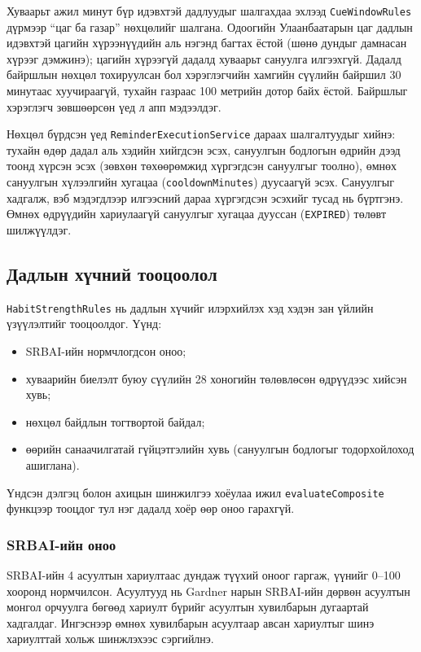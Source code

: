 Хуваарьт ажил минут бүр идэвхтэй дадлуудыг шалгахдаа эхлээд \texttt{CueWindowRules} дүрмээр ``цаг ба газар'' нөхцөлийг шалгана. Одоогийн Улаанбаатарын цаг дадлын идэвхтэй цагийн хүрээнүүдийн аль нэгэнд багтах ёстой (шөнө дундыг дамнасан хүрээг дэмжинэ); цагийн хүрээгүй дадалд хуваарьт сануулга илгээхгүй. Дадалд байршлын нөхцөл тохируулсан бол хэрэглэгчийн хамгийн сүүлийн байршил 30 минутаас хуучираагүй, тухайн газраас 100 метрийн дотор байх ёстой. Байршлыг хэрэглэгч зөвшөөрсөн үед л апп мэдээлдэг.

Нөхцөл бүрдсэн үед \texttt{ReminderExecutionService} дараах шалгалтуудыг хийнэ: тухайн өдөр дадал аль хэдийн хийгдсэн эсэх, сануулгын бодлогын өдрийн дээд тоонд хүрсэн эсэх (зөвхөн төхөөрөмжид хүргэгдсэн сануулгыг тоолно), өмнөх сануулгын хүлээлгийн хугацаа (\texttt{cooldownMinutes}) дуусаагүй эсэх. Сануулгыг хадгалж, вэб мэдэгдлээр илгээсний дараа хүргэгдсэн эсэхийг тусад нь бүртгэнэ. Өмнөх өдрүүдийн хариулаагүй сануулгыг хугацаа дууссан (\texttt{EXPIRED}) төлөвт шилжүүлдэг.

\subsection{Дадлын хүчний тооцоолол}

\texttt{HabitStrengthRules} нь дадлын хүчийг илэрхийлэх хэд хэдэн зан үйлийн үзүүлэлтийг тооцоолдог. Үүнд:

\begin{itemize}
    \item SRBAI-ийн нормчлогдсон оноо;
    \item хуваарийн биелэлт буюу сүүлийн 28 хоногийн төлөвлөсөн өдрүүдээс хийсэн хувь;
    \item нөхцөл байдлын тогтвортой байдал;
    \item өөрийн санаачилгатай гүйцэтгэлийн хувь (сануулгын бодлогыг тодорхойлоход ашиглана).
\end{itemize}

Үндсэн дэлгэц болон ахицын шинжилгээ хоёулаа ижил \texttt{evaluateComposite} функцээр тооцдог тул нэг дадалд хоёр өөр оноо гарахгүй.

\subsubsection*{SRBAI-ийн оноо}

SRBAI-ийн 4 асуултын хариултаас дундаж түүхий оноог гаргаж, үүнийг 0--100 хооронд нормчилсон. Асуултууд нь Gardner нарын SRBAI-ийн дөрвөн асуултын монгол орчуулга бөгөөд хариулт бүрийг асуултын хувилбарын дугаартай хадгалдаг. Ингэснээр өмнөх хувилбарын асуултаар авсан хариултыг шинэ хариулттай хольж шинжлэхээс сэргийлнэ.

